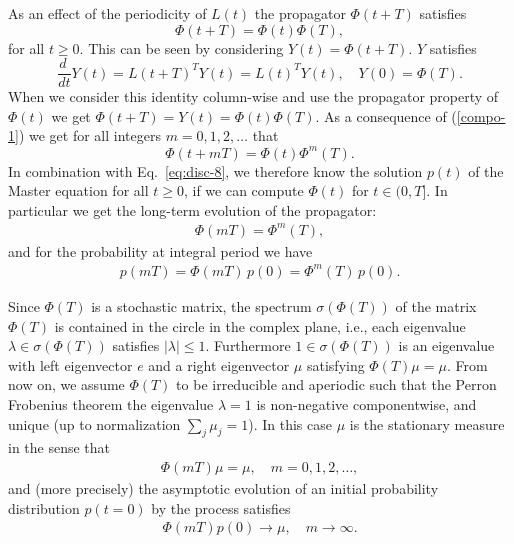 \documentclass[aps, pre, preprint,unsortedaddress,a4paper,onecolumn]{revtex4}
\newcommand{\vect}[1]{#1}
\newcommand{\myphi}{\Phi}
\newcommand{\mymu}{\mu}
\begin{document}
As an effect of the periodicity of $\vect L(t)$ the propagator $\myphi(t+T)$
satisfies
\begin{equation}\label{compo-1}
\myphi(t+T)=\myphi(t)\myphi(T),
\end{equation}
for all $t\ge 0$. This can be seen by considering $\vect Y(t)=\myphi(t+T)$. $\vect Y$ satisfies
\[
\frac{d\ }{dt}\vect Y(t)=\vect L(t+T)^T \vect Y(t)=\vect L(t)^T\vect Y(t),\quad \vect Y(0)=\myphi(T).
\]
When we consider this identity column-wise and use the propagator property of $\myphi(t)$ we get $\myphi(t+T)=\vect Y(t)=\myphi(t)\myphi(T)$. As a consequence of (\ref{compo-1}) we get for all integers $m=0,1,2,\ldots$ that 
\begin{equation}\label{compo-2}
\myphi(t+mT)=\myphi(t)\myphi^m(T).
\end{equation}
In combination with Eq.~\eqref{eq:disc-8}, we therefore
know the solution $\vect p(t)$ of the Master equation for all $t\ge 0$,
if we can compute $\myphi(t)$ for $t\in (0,T]$.  
In particular we get the long-term evolution of the propagator:
\begin{align}
\label{eq:floq-13}  
\myphi(mT)=\myphi^m(T),
\end{align}
and for the probability at integral period we have
\begin{align}
  \label{eq:floq-dynamics}
  p(mT) =  \myphi(mT)\, p(0) = \myphi^m(T)\, p(0).
\end{align}

Since $\myphi(T)$ is a stochastic matrix, the spectrum $\sigma(\myphi(T))$
of the matrix $\myphi(T)$ is contained in the circle in
the complex plane, i.e., each eigenvalue $\lambda\in \sigma(\myphi(T))$
satisfies $|\lambda|\le 1$. Furthermore $1\in\sigma(\myphi(T))$ is an
eigenvalue with left eigenvector $\vect e$ and a right eigenvector $\mymu$
satisfying
$\myphi(T)\mymu=\mymu$.
From now on, we assume $\myphi(T)$ to be irreducible and aperiodic such that the Perron Frobenius theorem the eigenvalue $\lambda=1$ is  non-negative componentwise, and unique (up to normalization $\sum_j\mu_j=1$). In this case $\mymu$ is the stationary measure in the sense that
\begin{align}
\label{eq:floq-14}  
\myphi(mT) \mymu = \mymu,\quad m=0,1,2,\ldots,
\end{align}
and (more precisely) the asymptotic evolution of an initial probability distribution $\vect p(t=0)$ by the process satisfies
\begin{align}
\label{eq:floq-15}  
\myphi(mT)\vect p(0)\to \mymu,\quad m\to\infty.
\end{align}
\end{document}

